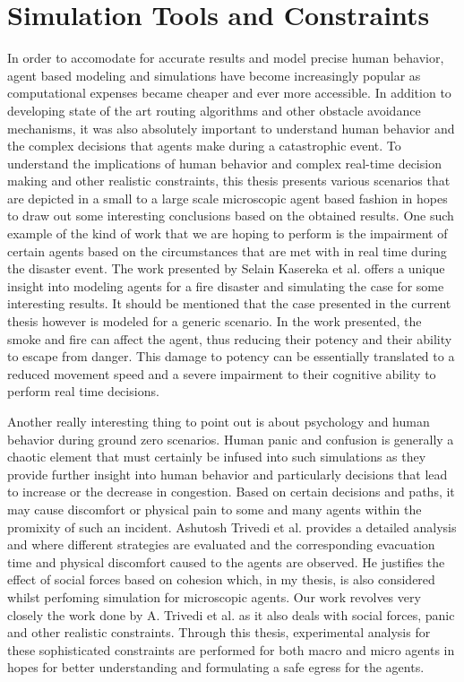 \section{Simulation Tools and Constraints}
\label{sec:pastwork:Simulation Tool and Constraints}

In order to accomodate for accurate results and model precise human behavior, agent based modeling and simulations have become increasingly popular as computational expenses became cheaper and ever more accessible. In addition to developing state of the art routing algorithms and other obstacle avoidance mechanisms, it was also absolutely important to understand human behavior and the complex decisions that agents make during a catastrophic event. To understand the implications of human behavior and complex real-time decision making and other realistic constraints, this thesis presents various scenarios that are depicted in a small to a large scale microscopic agent based fashion in hopes to draw out some interesting conclusions based on the obtained results. One such example of the kind of work that we are hoping to perform is the impairment of certain agents based on the circumstances that are met with in real time during the disaster event. The work presented by Selain Kasereka et al. \cite{ref20} offers a unique insight into modeling agents for a fire disaster and simulating the case for some interesting results. It should be mentioned that the case presented in the current thesis however is modeled for a generic scenario. In the work presented, the smoke and fire can affect the agent, thus reducing their potency and their ability to escape from danger. This damage to potency can be essentially translated to a reduced movement speed and a severe impairment to their cognitive ability to perform real time decisions. 

Another really interesting thing to point out is about psychology and human behavior during ground zero scenarios. Human panic and confusion is generally a chaotic element that must certainly be infused into such simulations as they provide further insight into human behavior and particularly decisions that lead to increase or the decrease in congestion. Based on certain decisions and paths, it may cause discomfort or physical pain to some and many agents within the promixity of such an incident. Ashutosh Trivedi et al. \cite{ref21} provides a detailed analysis and where different strategies are evaluated and the corresponding evacuation time and physical discomfort caused to the agents are observed. He justifies the effect of social forces based on cohesion which, in my thesis, is also considered whilst perfoming simulation for microscopic agents. Our work revolves very closely the work done by A. Trivedi et al. as it also deals with social forces, panic and other realistic constraints. Through this thesis, experimental analysis for these sophisticated constraints are performed for both macro and micro agents in hopes for better understanding and formulating a safe egress for the agents.

